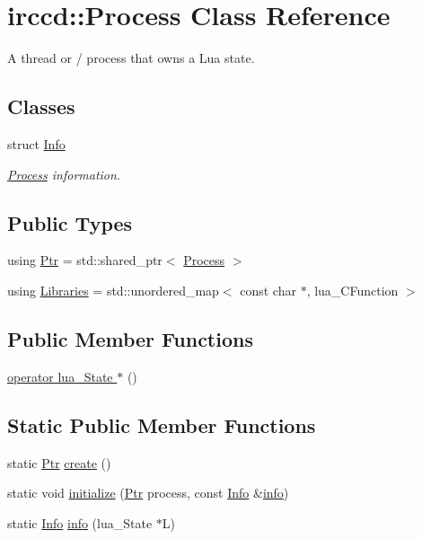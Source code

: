 \hypertarget{a00052}{\section{irccd\-:\-:Process Class Reference}
\label{a00052}
}


A thread or / process that owns a Lua state.  


\subsection*{Classes}
\begin{DoxyCompactItemize}
\item 
struct \hyperlink{a00030}{Info}
\begin{DoxyCompactList}\small\item\em \hyperlink{a00052}{Process} information. \end{DoxyCompactList}\end{DoxyCompactItemize}
\subsection*{Public Types}
\begin{DoxyCompactItemize}
\item 
using \hyperlink{a00052_a9333cbafb06dbf7cd0b6ed1a8e104c5c}{Ptr} = std\-::shared\-\_\-ptr$<$ \hyperlink{a00052}{Process} $>$
\item 
using \hyperlink{a00052_a842082fea27823c2eee6fb26972509c7}{Libraries} = std\-::unordered\-\_\-map$<$ const char $\ast$, lua\-\_\-\-C\-Function $>$
\end{DoxyCompactItemize}
\subsection*{Public Member Functions}
\begin{DoxyCompactItemize}
\item 
\hyperlink{a00052_aa4b4ac01ee64fbe74f8c9a0fda63ba1e}{operator lua\-\_\-\-State $\ast$} ()
\end{DoxyCompactItemize}
\subsection*{Static Public Member Functions}
\begin{DoxyCompactItemize}
\item 
static \hyperlink{a00052_a9333cbafb06dbf7cd0b6ed1a8e104c5c}{Ptr} \hyperlink{a00052_aefb31142c2a6410df0b55a31326ac9f5}{create} ()
\item 
static void \hyperlink{a00052_a0f725cab5a953214a5d7145ef7be0cd0}{initialize} (\hyperlink{a00052_a9333cbafb06dbf7cd0b6ed1a8e104c5c}{Ptr} process, const \hyperlink{a00030}{Info} \&\hyperlink{a00052_ac25c89d679fb765b8a5538bd76126b60}{info})
\item 
static \hyperlink{a00030}{Info} \hyperlink{a00052_ac25c89d679fb765b8a5538bd76126b60}{info} (lua\-\_\-\-State $\ast$L)
\end{DoxyCompactItemize}
